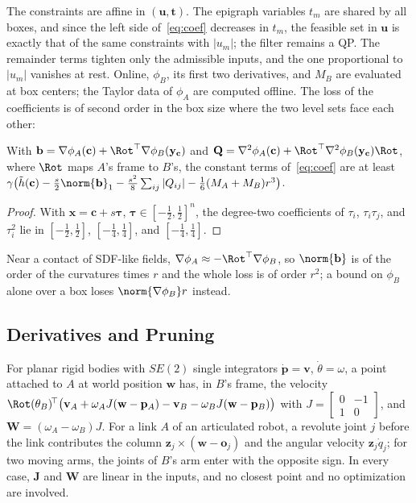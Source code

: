 The constraints are affine in $(\mathbf u,\mathbf t)$. The epigraph variables $t_m$ are shared by all
boxes, and since the left side of~\eqref{eq:coef} decreases in $t_m$, the feasible set in $\mathbf u$
is exactly that of the same constraints with $|u_m|$; the filter remains a QP. The remainder terms
tighten only the admissible inputs, and the one proportional to $|u_m|$ vanishes at rest. Online,
$\phi_B$, its first two derivatives, and $M_B$ are evaluated at box centers; the Taylor data of
$\phi_A$ are computed offline. The loss of the coefficients is of second order in the box size where
the two level sets face each other:
\begin{proposition}\label{prop:tight}
With $\mathbf b=\nabla\phi_A(\mathbf c)+\Rot^\top\nabla\phi_B(\mathbf y_{\mathbf c})$ and
$\mathbf Q=\nabla^2\phi_A(\mathbf c)+\Rot^\top\nabla^2\phi_B(\mathbf y_{\mathbf c})\Rot$, where
$\Rot$ maps $A$'s frame to $B$'s, the constant terms of~\eqref{eq:coef} are at least
$\gamma\big(\tilde h(\mathbf c)-\tfrac s2\norm{\mathbf b}_1-\tfrac{s^2}8\sum_{ij}|Q_{ij}|
-\tfrac16(M_A+M_B)r^3\big)$.
\end{proposition}
\begin{proof}
With $\mathbf x=\mathbf c+s\boldsymbol\tau$, $\boldsymbol\tau\in[-\frac12,\frac12]^n$, the degree-two
coefficients of $\tau_i$, $\tau_i\tau_j$, and $\tau_i^2$ lie in $[-\frac12,\frac12]$,
$[-\frac14,\frac14]$, and $[-\frac14,\frac14]$.
\end{proof}
Near a contact of SDF-like fields, $\nabla\phi_A\approx-\Rot^\top\nabla\phi_B$, so $\norm{\mathbf b}$ is
of the order of the curvatures times $r$ and the whole loss is of order $r^2$; a bound on $\phi_B$
alone over a box loses $\norm{\nabla\phi_B}r$ instead.

\subsection{Derivatives and Pruning}\label{sec:cover-der}
For planar rigid bodies with $SE(2)$ single integrators $\dot{\mathbf p}=\mathbf v$,
$\dot\theta=\omega$, a point attached to $A$ at world position $\mathbf w$ has, in $B$'s frame, the
velocity
$\Rot(\theta_B)^{\!\top}\big(\mathbf v_A+\omega_AJ(\mathbf w-\mathbf p_A)-\mathbf v_B-\omega_BJ(\mathbf w-\mathbf p_B)\big)$
with $J=\left[\begin{smallmatrix}0&-1\\1&0\end{smallmatrix}\right]$, and
$\mathbf W=(\omega_A-\omega_B)J$. For a link $A$ of an articulated robot, a revolute joint $j$ before
the link contributes the column $\mathbf z_j\times(\mathbf w-\mathbf o_j)$ and the angular velocity
$\mathbf z_j\dot q_j$; for two moving arms, the joints of $B$'s arm enter with the opposite sign. In
every case, $\mathbf J$ and $\mathbf W$ are linear in the inputs, and no closest point and no
optimization are involved.

